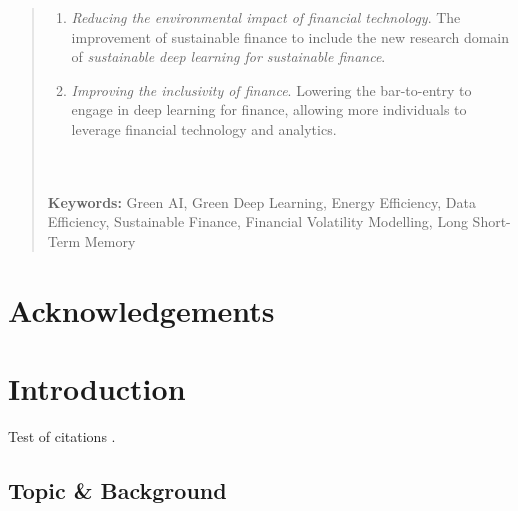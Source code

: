 \documentclass[a4paper, 12pt]{report}
\begin{document}
\begin{abstract}
\begin{enumerate}
            \item \emph{Reducing the environmental impact of financial technology}. The improvement of sustainable finance to include the new research domain of \emph{sustainable deep learning for sustainable finance}. 

            \item \emph{Improving the inclusivity of finance}. Lowering the bar-to-entry to engage in deep learning for finance,  allowing more individuals to leverage financial technology and analytics.
        \end{enumerate}
        
        \textbf{\\ \\Keywords:} Green AI, Green Deep Learning, Energy Efficiency, Data Efficiency, Sustainable Finance, Financial Volatility Modelling, Long Short-Term Memory

    \end{abstract}


    \newpage
    \chapter*{Acknowledgements}
    \blindtext 


    \newpage
    \tableofcontents


    \newpage 
    \listoffigures


    \newpage
    \listoftables 




    \newpage
    \chapter{Introduction}
    \label{chapter: intro}

    Test of citations \citep{xu-2021}.

    \section{Topic \& Background}
    \label{section: topic}
\end{document}
